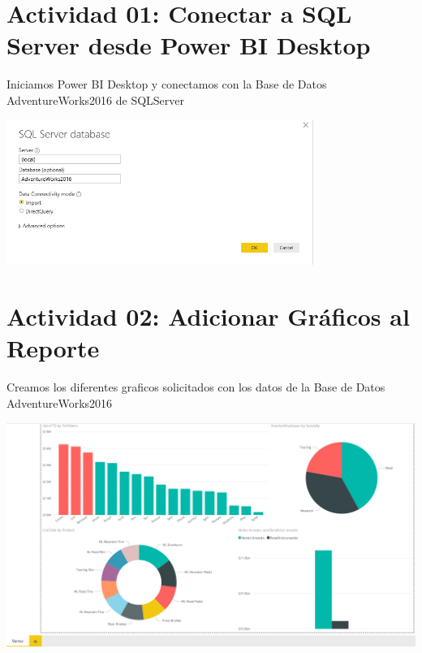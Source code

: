 \section{Actividad 01: Conectar a SQL Server desde Power BI Desktop } 

Iniciamos Power BI Desktop y conectamos con la Base de Datos AdventureWorks2016 de SQLServer

	\begin{center}
	\includegraphics[width=10cm]{./Imagenes/Img1}
	\end{center}	
\section{Actividad 02: Adicionar Gráficos al Reporte } 

Creamos los diferentes graficos solicitados con los datos de la Base de Datos AdventureWorks2016


	\begin{center}
	\includegraphics[width=17cm]{./Imagenes/Img2}
	\end{center}

